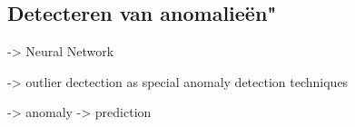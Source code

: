 
\subsection{Detecteren van anomalie\"en"}
\label{subsection:anomaly}

\TODO

\TODO \cite{ramesh2012wireless} -> Neural Network

\TODO \cite{zhang2010outlier} -> outlier dectection as special anomaly detection techniques

\TODO \cite{zhijie2012intrusion} -> anomaly -> prediction

